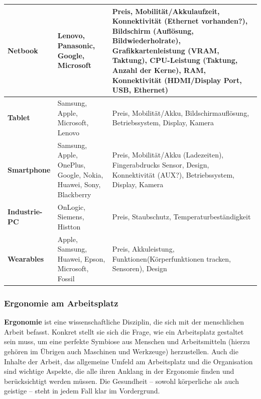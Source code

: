 \documentclass[10pt]{article}
\begin{document}
\begin{flushleft}
\begin{longtable}{|l|p{6cm}|p{6cm}|}
        \textbf{Netbook} & Lenovo, Panasonic, Google, Microsoft & Preis, Mobilität/Akkulaufzeit, Konnektivität (Ethernet vorhanden?), Bildschirm (Auflösung, Bildwiederholrate), Grafikkartenleistung (VRAM, Taktung), CPU-Leistung (Taktung, Anzahl der Kerne), RAM, Konnektivität (HDMI/Display Port, USB, Ethernet) \\\hline

        \textbf{Tablet} & Samsung, Apple, Microsoft, Lenovo & Preis, Mobilität/Akku, Bildschirmauflösung, Betriebssystem, Display, Kamera \\\hline 

        \textbf{Smartphone} & Samsung, Apple, OnePlus, Google, Nokia, Huawei, Sony, Blackberry & Preis, Mobilität/Akku (Ladezeiten), Fingerabdrucks Sensor, Design, Konnektivität (AUX?), Betriebssystem, Display, Kamera \\\hline

        \textbf{Industrie-PC} & OnLogic, Siemens, Histton & Preis, Staubschutz, Temperaturbeständigkeit \\\hline

        \textbf{Wearables} & Apple, Samsung, Huawei, Epson, Microsoft, Fossil & Preis, Akkuleistung, Funktionen(Körperfunktionen tracken, Sensoren), Design

        \\\hline
\end{longtable}

\break

\subsubsection{Ergonomie am Arbeitsplatz}

\textbf{Ergonomie} ist eine wissenschaftliche Disziplin, die sich mit der menschlichen Arbeit befasst. Konkret stellt sie sich die Frage, wie ein Arbeitsplatz gestaltet sein muss, um eine perfekte Symbiose aus Menschen und Arbeitsmitteln (hierzu gehören im Übrigen auch Maschinen und Werkzeuge) herzustellen. Auch die Inhalte der Arbeit, das allgemeine Umfeld am Arbeitsplatz und die Organisation sind wichtige Aspekte, die alle ihren Anklang in der Ergonomie finden und berücksichtigt werden müssen. Die Gesundheit – sowohl körperliche als auch geistige – steht in jedem Fall klar im Vordergrund.


\end{flushleft}
\end{document}
